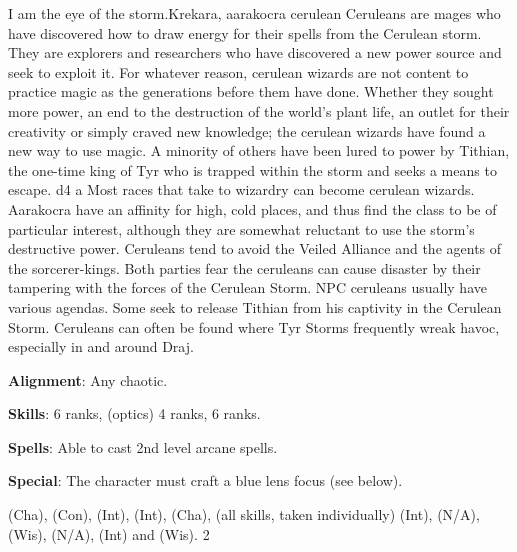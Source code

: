 {I am the eye of the storm.}{Krekara, aarakocra cerulean}
{
Ceruleans are mages who have discovered how to draw energy for their spells from the Cerulean storm. They are explorers and researchers who have discovered a new power source and seek to exploit it. For whatever reason, cerulean wizards are not content to practice magic as the generations before them have done. Whether they sought more power, an end to the destruction of the world's plant life, an outlet for their creativity or simply craved new knowledge; the cerulean wizards have found a new way to use magic. A minority of others have been lured to power by Tithian, the one-time king of Tyr who is trapped within the storm and seeks a means to escape.
}
{d4}
{a}
{
Most races that take to wizardry can become cerulean wizards. Aarakocra have an affinity for high, cold places, and thus find the class to be of particular interest, although they are somewhat reluctant to use the storm's destructive power. Ceruleans tend to avoid the Veiled Alliance and the agents of the sorcerer-kings. Both parties fear the ceruleans can cause disaster by their tampering with the forces of the Cerulean Storm. NPC ceruleans usually have various agendas. Some seek to release Tithian from his captivity in the Cerulean Storm. Ceruleans can often be found where Tyr Storms frequently wreak havoc, especially in and around Draj.
}
{
\textbf{Alignment}: Any chaotic.

\textbf{Skills}:  6 ranks,  (optics) 4 ranks,  6 ranks.


\textbf{Spells}: Able to cast 2nd level arcane spells.

\textbf{Special}: The character must craft a blue lens focus (see below).
}
{ (Cha),  (Con),  (Int),  (Int),  (Cha),  (all skills, taken individually) (Int),  (N/A),  (Wis),  (N/A),  (Int) and  (Wis).}
{2}
